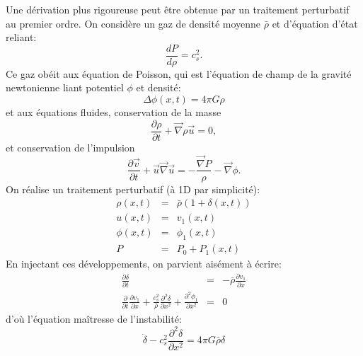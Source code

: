 Une dérivation plus rigoureuse peut être obtenue par un traitement perturbatif au premier ordre. On considère un gaz de densité moyenne $\bar \rho$ et d'équation d'état reliant:
\begin{equation}
\frac{dP}{d\rho}=c_s^2.
\end{equation}
Ce gaz obéit aux équation de Poisson, qui est l'équation de champ de la gravité newtonienne liant potentiel $\phi$ et densité:
\begin{equation}
\Delta \phi(x,t) = 4 \pi G \rho
\end{equation}
 et aux équations fluides, conservation de la masse
 \begin{equation}
 \frac{\partial \rho}{\partial t} + \vec \nabla \rho \vec u=0,
 \end{equation}
 et conservation de l'impulsion
 \begin{equation}
 \frac{\partial \vec v}{\partial t} +\vec u \vec \nabla \vec u = -\frac{\vec \nabla P}{\rho}-\vec \nabla \phi.
 \end{equation}
 On réalise un traitement perturbatif (à 1D par simplicité):
 \begin{eqnarray}
 \rho(x,t)&=&\bar \rho(1 +\delta(x,t))\\
 u(x,t)&=&v_1(x,t)\\
 \phi(x,t)&=&\phi_1(x,t)\\
 P&=&P_0+P_1(x,t)
 \end{eqnarray}
 En injectant ces développements, on parvient aisément à écrire:
 \begin{eqnarray}
 \frac{\partial \delta}{\partial t}&=&-\bar \rho \frac{\partial v_1}{\partial x}\\
 \frac{\partial}{\partial t}\frac{\partial v_1}{\partial x}+\frac{c_s^2}{\bar \rho}\frac{\partial^2 \delta}{\partial x^2}+\frac{\partial^2 \phi_1}{\partial x^2}&=&0
 \end{eqnarray}
 d'où l'équation maîtresse de l'instabilité:
 \begin{equation}
 \ddot \delta -c_s ^2\frac{\partial^2 \delta}{\partial x^2}=4\pi G \bar \rho \delta
 \end{equation}
